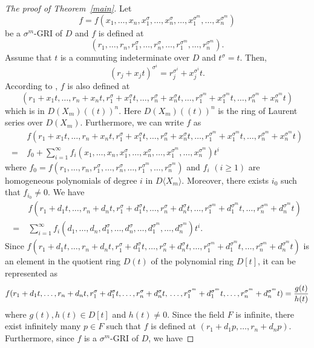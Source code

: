 \documentclass{cimart}
\begin{document}
\begin{proof}[The proof of {\rm Theorem~\ref{main}}] Let $$f=f(x_1,\dots,x_n,x_1^\sigma,\dots,x_n^\sigma,\dots,x_1^{\sigma^m},\dots,x_n^{\sigma^m})$$ be a $\sigma^m$-GRI of $D$ and $f$ is defined at $$(r_1,\dots,r_n,r_1^\sigma,\dots,r_n^\sigma,\dots,r_1^{\sigma^m},\dots,r_n^{\sigma^m}).$$
	Assume that $t$ is a commuting indeterminate over $D$ and $t^\sigma=t$. Then, $$(r_j+x_jt)^{\sigma^i}=r_j^{\sigma^i}+x_j^{\sigma^i}t.$$ According to \cite[Lemma 7]{chiba}, $f$ is also defined at
	$$(r_1+x_1t,\dots,r_n+x_nt,r_1^\sigma+x_1^\sigma t,\dots,r_n^\sigma+x_n^\sigma t,\dots,r_1^{\sigma^m}+x_1^{\sigma^m}t,\dots,r_n^{\sigma^m}+x_n^{\sigma^m}t)$$ which is in $D(X_m)((t))^n$.
	Here $D(X_m)((t))^n$ is the ring of Laurent series over $D(X_m)$. Furthermore, we can write $f$ as
	\begin{align*}
& \ f(r_1+x_1t,\dots,r_n+x_nt,r_1^\sigma+x_1^\sigma t,\dots,r_n^\sigma+x_n^\sigma t,\dots,r_1^{\sigma^m}+x_1^{\sigma^m}t,\dots,r_n^{\sigma^m}+x_n^{\sigma^m}t)\\
	=& \ f_0+\sum_{i=1}^\infty f_i(x_1,\dots,x_n,x_1^\sigma,\dots,x_n^\sigma,\dots,x_1^{\sigma^m},\dots,x_n^{\sigma^m})t^i
	\end{align*}
	where $f_0=f(r_1,\dots,r_n,r_1^\sigma,\dots,r_n^\sigma,\dots,r_1^{\sigma^m},\dots,r_n^{\sigma^m})$ and $f_i$ $(i\geq 1)$ are homogeneous polynomials of degree $i$ in $D\langle X_m\rangle$. Moreover, there exists $i_0$ such that $f_{i_0}\neq 0$. We have
	\begin{align*}
& \ f(r_1+d_1t,\dots,r_n+d_nt,r_1^\sigma+d_1^\sigma t,\dots,r_n^\sigma+d_n^\sigma t,\dots,r_1^{\sigma^m}+d_1^{\sigma^m}t,\dots,r_n^{\sigma^m}+d_n^{\sigma^m}t)\\
	=& \ \sum_{i=1}^\infty f_i(d_1,\dots,d_n,d_1^\sigma,\dots,d_n^\sigma,\dots,d_1^{\sigma^m},\dots,d_n^{\sigma^m})t^i.
	\end{align*}
	Since $f(r_1+d_1t,\dots,r_n+d_nt,r_1^\sigma+d_1^\sigma t,\dots,r_n^\sigma+d_n^\sigma t,\dots,r_1^{\sigma^m}+d_1^{\sigma^m}t,\dots,r_n^{\sigma^m}+d_n^{\sigma^m}t)$ is an element in the quotient ring $D(t)$ of the polynomial ring $D[t]$, it can be represented as
	$$f(r_1+d_1t,\dots,r_n+d_nt,r_1^\sigma+d_1^\sigma t,\dots,r_n^\sigma+d_n^\sigma t,\\ \dots,r_1^{\sigma^m}+d_1^{\sigma^m}t,\dots,r_n^{\sigma^m}+d_n^{\sigma^m}t)=\frac{g(t)}{h(t)}$$
	where $g(t),h(t)\in D[t]$ and $h(t)\neq 0$. Since the field $F$ is infinite, there exist infinitely many $p\in F$ such that $f$ is defined at $(r_1+d_1p,\dots,r_n+d_np)$. Furthermore, since $f$ is a $\sigma^m$-GRI of $D$, we have

\end{proof}
\end{document}
